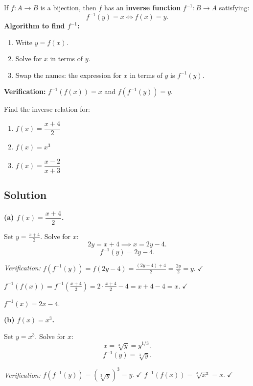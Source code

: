 \documentclass[12pt, a4paper]{article}
\begin{document}
\begin{theorybox}
If $f : A \to B$ is a bijection, then $f$ has an \textbf{inverse function} $f^{-1} : B \to A$ satisfying:
\[
  f^{-1}(y) = x \iff f(x) = y.
\]
\textbf{Algorithm to find $f^{-1}$:}
\begin{enumerate}[nosep]
  \item Write $y = f(x)$.
  \item Solve for $x$ in terms of $y$.
  \item Swap the names: the expression for $x$ in terms of $y$ is $f^{-1}(y)$.
\end{enumerate}

\textbf{Verification:} $f^{-1}(f(x)) = x$ and $f(f^{-1}(y)) = y$.
\end{theorybox}

\begin{problembox}
Find the inverse relation for:
\begin{enumerate}[label=(\alph*), nosep]
  \item $f(x) = \dfrac{x+4}{2}$
  \item $f(x) = x^3$
  \item $f(x) = \dfrac{x-2}{x+3}$
\end{enumerate}
\end{problembox}

\subsection*{Solution}

\textbf{(a)\; $f(x) = \dfrac{x+4}{2}$.}

Set $y = \frac{x+4}{2}$. Solve for $x$:
\[
  2y = x + 4 \implies x = 2y - 4.
\]
\[
  \boxed{f^{-1}(y) = 2y - 4.}
\]

\emph{Verification:}\; $f(f^{-1}(y)) = f(2y-4) = \frac{(2y-4)+4}{2} = \frac{2y}{2} = y.\;\checkmark$

$f^{-1}(f(x)) = f^{-1}\!\left(\frac{x+4}{2}\right) = 2 \cdot \frac{x+4}{2} - 4 = x + 4 - 4 = x.\;\checkmark$

\begin{answerbox}
$f^{-1}(x) = 2x - 4.$
\end{answerbox}

\bigskip
\textbf{(b)\; $f(x) = x^3$.}

Set $y = x^3$. Solve for $x$:
\[
  x = \sqrt[3]{y} = y^{1/3}.
\]
\[
  \boxed{f^{-1}(y) = \sqrt[3]{y}.}
\]

\emph{Verification:}\; $f(f^{-1}(y)) = (\sqrt[3]{y})^3 = y.\;\checkmark$ \quad
$f^{-1}(f(x)) = \sqrt[3]{x^3} = x.\;\checkmark$
\end{document}
